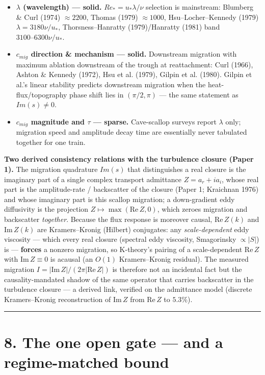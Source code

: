 \documentclass[11pt]{article}
\begin{document}
\begin{itemize}
\item \textbf{$\lambda $ (wavelength) — solid.} $Re_*=u_*\lambda /\nu $ selection is mainstream: Blumberg \& Curl (1974) $\approx 2200$, Thomas (1979) $\approx 1000$, Hsu–Locher–Kennedy (1979) $\lambda =3180 \nu /u_*$, Thorsness–Hanratty (1979)/Hanratty (1981) band $3100–6300 \nu /u_*$.
\item \textbf{$c_{mig}$ direction \& mechanism — solid.} Downstream migration with maximum ablation downstream of the trough at reattachment: Curl (1966), Ashton \& Kennedy (1972), Hsu et al. (1979), Gilpin et al. (1980). Gilpin et al.'s linear stability predicts downstream migration when the heat-flux/topography phase shift lies in $(\pi /2, \pi )$ — the same statement as $Im(s)\ne 0$.
\item \textbf{$c_{mig}$ magnitude and $\tau $ — sparse.} Cave-scallop surveys report $\lambda $ only; migration speed and amplitude decay time are essentially never tabulated together for one train.
\end{itemize}


\textbf{Two derived consistency relations with the turbulence closure (Paper 1).} The migration quadrature $Im(s)$ that distinguishes a real closure is the imaginary part of a single complex transport admittance $Z=a_{r}+ia_{i}$, whose real part is the amplitude-rate / backscatter of the closure (Paper 1; Kraichnan 1976) and whose imaginary part is this scallop migration; a down-gradient eddy diffusivity is the projection $Z\mapsto \max(\mathrm{Re}\,Z,0)$, which zeroes migration and backscatter \emph{together}. Because the flux response is moreover causal, $\mathrm{Re}\,Z(k)$ and $\mathrm{Im}\,Z(k)$ are Kramers--Kronig (Hilbert) conjugates: any \emph{scale-dependent} eddy viscosity --- which every real closure (spectral eddy viscosity, Smagorinsky $\propto |S|$) is --- \textbf{forces} a nonzero migration, so K-theory's pairing of a scale-dependent $\mathrm{Re}\,Z$ with $\mathrm{Im}\,Z\equiv 0$ is acausal (an $O(1)$ Kramers--Kronig residual). The measured migration $I=|\mathrm{Im}\,Z|/(2\pi |\mathrm{Re}\,Z|)$ is therefore not an incidental fact but the causality-mandated shadow of the same operator that carries backscatter in the turbulence closure --- a derived link, verified on the admittance model (discrete Kramers--Kronig reconstruction of $\mathrm{Im}\,Z$ from $\mathrm{Re}\,Z$ to $5.3\%$).


\medskip\hrule\medskip


\section*{8. The one open gate — and a regime-matched bound}
\end{document}

